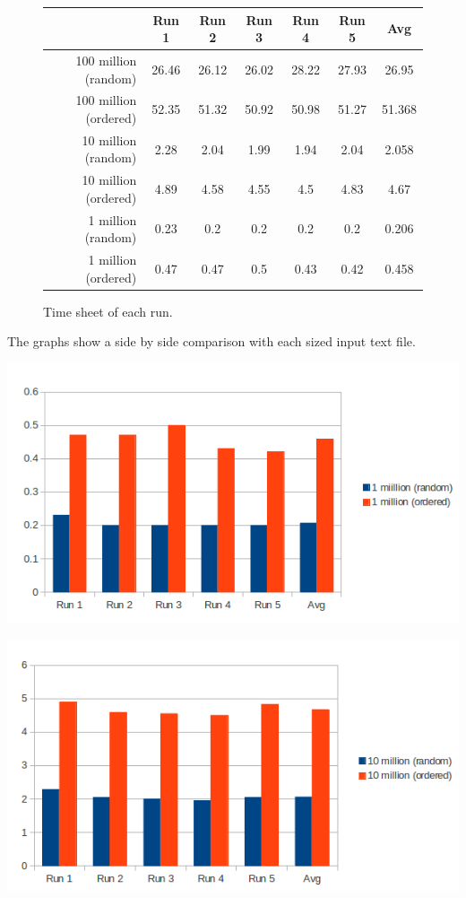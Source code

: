 \documentclass[12pt,letterpaper]{article}
\begin{document}
\begin{figure}
\begin{center}
\begin{tabular}{|r | c | c | c | c | c| c|}
\hline
							& \textbf{Run 1}		&\textbf{Run 2}   	&\textbf{Run 3}		&\textbf{Run 4}	&\textbf{Run 5}	&\textbf{Avg} \\
						\hline 
100 million (random)	&26.46		&26.12		&26.02		&28.22	&27.93	&26.95 \\
100 million (ordered)	&52.35		&51.32		&50.92		&50.98	&51.27	&51.368\\
10 million (random)	&2.28	  		&2.04			&1.99			&1.94		&2.04		&2.058\\
10 million (ordered)	&4.89			&4.58			&4.55			&4.5		&4.83		&4.67\\
1 million (random)	     &0.23			&0.2			&0.2			&0.2		&0.2	     &0.206\\
1 million (ordered) 	&0.47			&0.47			&0.5			&0.43		&0.42		&0.458 \\
\hline
\end{tabular}
\caption{Time sheet of each run.}
\end{center}
\end{figure}

The graphs show  a side by side comparison with each sized input text file.


\includegraphics[scale=.5]{1mill.png}

\includegraphics[scale=.5]{10million.png}
\end{document}
